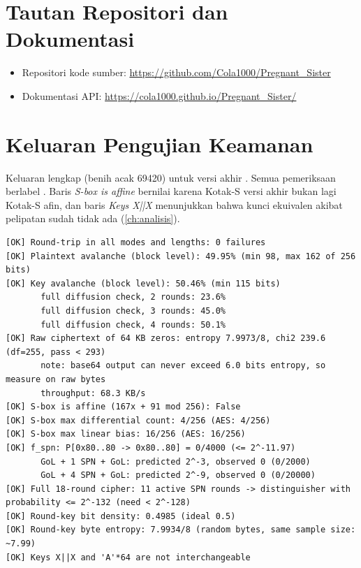 \chapter{Tautan Repositori dan Dokumentasi}
\label{app:tautan}
\begin{itemize}
    \item Repositori kode sumber: \url{https://github.com/Cola1000/Pregnant_Sister}
    \item Dokumentasi API: \url{https://cola1000.github.io/Pregnant_Sister/}
\end{itemize}

\chapter{Keluaran Pengujian Keamanan}
\label{app:security}
Keluaran lengkap  (benih acak 69420) untuk versi akhir \algname{}. Semua pemeriksaan berlabel \code{[OK]}. Baris \textit{S-box is affine} bernilai  karena Kotak-S versi akhir bukan lagi Kotak-S afin, dan baris \textit{Keys X||X} menunjukkan bahwa kunci ekuivalen akibat pelipatan sudah tidak ada (\cref{ch:analisis}).

\begin{lstlisting}[numbers=none, basicstyle=\ttfamily\scriptsize, caption={Keluaran \code{test\_security}}]
[OK] Round-trip in all modes and lengths: 0 failures
[OK] Plaintext avalanche (block level): 49.95% (min 98, max 162 of 256 bits)
[OK] Key avalanche (block level): 50.46% (min 115 bits)
       full diffusion check, 2 rounds: 23.6%
       full diffusion check, 3 rounds: 45.0%
       full diffusion check, 4 rounds: 50.1%
[OK] Raw ciphertext of 64 KB zeros: entropy 7.9973/8, chi2 239.6 (df=255, pass < 293)
       note: base64 output can never exceed 6.0 bits entropy, so measure on raw bytes
       throughput: 68.3 KB/s
[OK] S-box is affine (167x + 91 mod 256): False
[OK] S-box max differential count: 4/256 (AES: 4/256)
[OK] S-box max linear bias: 16/256 (AES: 16/256)
[OK] f_spn: P[0x80..80 -> 0x80..80] = 0/4000 (<= 2^-11.97)
       GoL + 1 SPN + GoL: predicted 2^-3, observed 0 (0/2000)
       GoL + 4 SPN + GoL: predicted 2^-9, observed 0 (0/20000)
[OK] Full 18-round cipher: 11 active SPN rounds -> distinguisher with probability <= 2^-132 (need < 2^-128)
[OK] Round-key bit density: 0.4985 (ideal 0.5)
[OK] Round-key byte entropy: 7.9934/8 (random bytes, same sample size: ~7.99)
[OK] Keys X||X and 'A'*64 are not interchangeable
\end{lstlisting}

